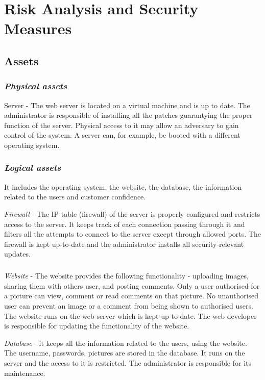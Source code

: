 \section{Risk Analysis and Security Measures}

\subsection{Assets}

\subsubsection{{\it Physical assets}}
Server - The web server is located on a virtual machine and is up to date. The administrator is responsible of installing all the patches guarantying the proper function of the server. 
Physical access to it may allow an adversary to gain control of the system. A server can,
for example, be booted with a different operating system.

\subsubsection{{\it Logical assets}}
It includes the operating system, the website, the database, the information related to the users and customer confidence. 

\textit{Firewall} - The IP table (firewall) of the server is properly configured and restricts access to the server. It keeps track of each connection passing through it and filters all the attempts to connect to the server except through allowed ports. The firewall is kept up-to-date and the administrator installs all security-relevant updates.


\subparagraph{} \textit{Website} - The website provides the following functionality - uploading images, sharing them with others user, and posting comments. Only a user authorised for a picture can view, comment or read comments on that picture. No unauthorised user can prevent an image or a comment from being shown to authorised users. The website runs on the web-server which is kept up-to-date. The web developer is responsible for updating the functionality of the website. 

\textit{Database} - it keeps all the information related to the users, using the website. The username, passwords, pictures are stored in the database. It runs on the server and the access to it is restricted. The administrator is responsible for its maintenance.

